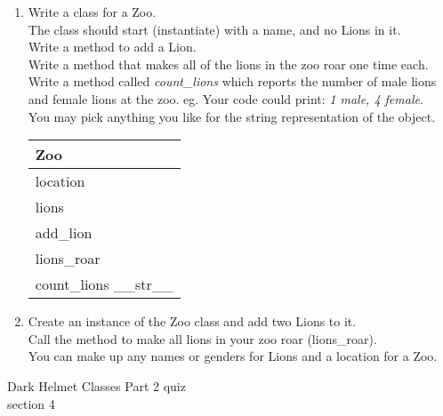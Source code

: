 \documentclass{article}
\begin{document}
\begin{enumerate}
\begin{enumerate}
		\item
			Write a class for a Zoo. \\
			The class should start (instantiate) with a name, and no Lions in it. \\ 
			Write a method to add a Lion.\\
			Write a method that makes all of the lions in the zoo roar one time each.\\
			Write a method called \textit{count\_lions} which reports the number of male 
			lions and female lions at the zoo. eg. Your code could print: \textit{1 male, 4 female}.\\
			You may pick anything you like for the string representation of the object.
	
			\begin{flushright}
			\begin{tabular}{|l|}
				\hline
				Zoo\\ \hline  	%
				location\\ lions\\ \hline		%
				add\_lion\\ lions\_roar \\ count\_lions \_\_str\_\_ \\ \hline		%
			\end{tabular}
			\end{flushright}

		\item
			Create an instance of the Zoo class and add two Lions to it.\\
			Call the method to make all lions in your zoo roar (lions\_roar).\\
			You can make up any names or genders for Lions and a location for a Zoo.\\
	\end{enumerate}
\pagebreak

\end{enumerate}
\pagebreak
Dark Helmet \hfill Classes Part 2 quiz\\
section 4\\
\end{document}

